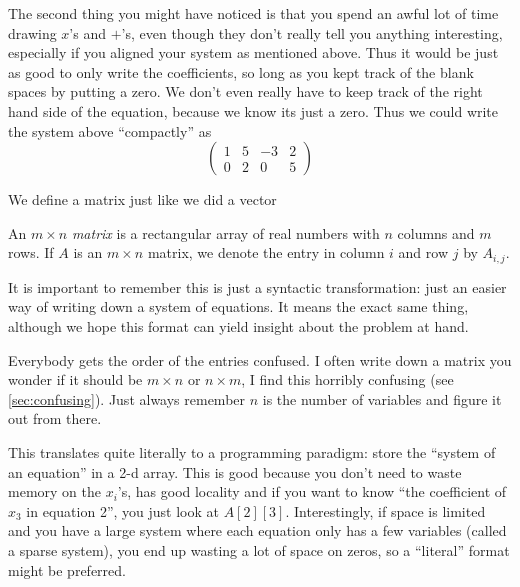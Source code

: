 The second thing you might have noticed is that you spend an awful lot of time drawing $x$'s and $+$'s, even though they don't really tell you anything interesting, especially if you aligned your system as mentioned above.
Thus it would be just as good to only write the coefficients, so long as you kept track of the blank spaces by putting a zero.
We don't even really have to keep track of the right hand side of the equation, because we know its just a zero.  
Thus we could write the system above ``compactly'' as
\[\left(\begin{array}{cccc}
  1 & 5 & -3 &  2\\
  0 & 2 & 0  &  5
\end{array}\right)\]

We define a matrix just like we did a vector
\begin{Def}[Matrix]
  An $m\times n$ \emph{matrix} is a rectangular array of real numbers with $n$ columns and $m$ rows.  
  If $A$ is an $m\times n$ matrix, we denote the entry in column $i$ and row $j$ by $A_{i,j}$.
\end{Def}

\begin{Remark}
  It is important to remember this is just a syntactic transformation: just an easier way of writing down a system of equations.
  It means the exact same thing, although we hope this format can yield insight about the problem at hand.   
\end{Remark}

\begin{Remark}
  Everybody gets the order of the entries confused. 
  I often write down a matrix you wonder if it should be $m\times n$ or $n\times m$, I find this horribly confusing (see \ref{sec:confusing}).
  Just always remember $n$ is the number of variables and figure it out from there.  
\end{Remark}

\begin{RemarkProg}
  This translates quite literally to a programming paradigm: store the ``system of an equation'' in a 2-d array.  
  This is good because you don't need to waste memory on the $x_i$'s, has good locality and if you want to know ``the coefficient of $x_3$ in equation 2'', you just look at $A[2][3]$. 
  Interestingly, if space is limited and you have a large system where each equation only has a few variables (called a sparse system), you end up wasting a lot of space on zeros, so a ``literal'' format might be preferred.  
\end{RemarkProg}

